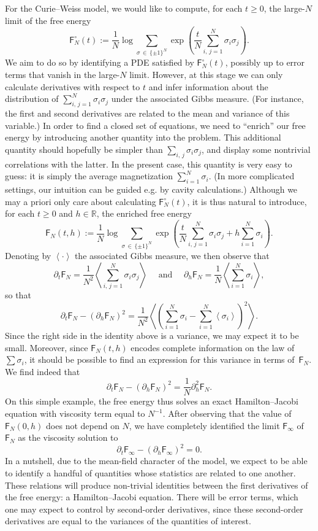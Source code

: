 \documentclass[10pt]{amsart}
\theoremstyle{definition}\newtheorem{defi}[theo]{Definition}\newtheorem{rema}[theo]{Remark}\newtheorem{exam}[theo]{Example}\newtheorem{exem}[theo]{Example}\newtheorem{nota}[theo]{Notation}
\newcommand{\R}{\mathbb{R}}
\newcommand{\sfF}{\mathsf{F}}
\newcommand{\1}{\mathds{1}}
\renewcommand{\ge}{\geqslant}
\newcommand{\la}{\left\langle}
\newcommand{\ra}{\right\rangle}
\begin{document}
For the Curie--Weiss model, we would like to compute, for each $t \ge 0$, the large-$N$ limit of the free energy
\[
\sfF_N^\circ(t) := \frac 1 N \log \sum_{\sigma\, \in\,\{\pm 1\}^N} \exp \left(\frac t N \sum_{i,\,j = 1}^N \sigma_i \sigma_j \right).
\]
We aim to do so by identifying a PDE satisfied by $\sfF_N^\circ(t)$, possibly up to error terms that vanish in the large-$N$ limit. However, at this stage we can only calculate derivatives with respect to $t$ and infer information about the distribution of $\sum_{i,\,j = 1}^N \sigma_i \sigma_j$ under the associated Gibbs measure. (For instance, the first and second derivatives are related to the mean and variance of this variable.) In order to find a closed set of equations, we need to ``enrich'' our free energy by introducing another quantity into the problem. This additional quantity should hopefully be simpler than $\sum_{i,\,j} \sigma_i \sigma_j$, and display some nontrivial correlations with the latter. In the present case, this quantity is very easy to guess: it is simply the average magnetization $\sum_{i = 1}^N \sigma_i$. (In more complicated settings, our intuition can be guided e.g. by cavity calculations.) Although we may a priori only care about calculating $\sfF_N^\circ(t)$, it is thus natural to introduce, for each $t \ge 0$ and $h \in \R$, the enriched free energy
\[
\sfF_N(t,h) := \frac 1 N \log \sum_{\sigma\,\in \,\{\pm1\}^N} \exp \left(\frac t N \sum_{i,\,j = 1}^N \sigma_i \sigma_j + h \sum_{i = 1}^N \sigma_i\right).
\]
Denoting by $\la \cdot \ra$ the associated Gibbs measure, we then observe that
\begin{equation}\label{e.also.rfcw}
\partial_t \sfF_N = \frac{1}{N^2} \la \sum_{i,\,j = 1}^N \sigma_i \sigma_j \ra \quad \text{ and } \quad
\partial_h \sfF_N = \frac{1}{N} \la \sum_{i = 1}^N \sigma_i \ra,
\end{equation}
so that
\[
\partial_t\sfF_N - \left(\partial_h \sfF_N\right)^2 = \frac 1 {N^2} \la \left(\sum_{i = 1}^N \sigma_i - \sum_{i = 1}^N\la \sigma_i \ra \right)^2 \ra.
\]
Since the right side in the identity above is a variance, we may expect it to be small. Moreover, since $\sfF_N(t,h)$ encodes complete information on the law of $\sum \sigma_i$, it should be possible to find an expression for this variance in terms of~$\sfF_N$. We find indeed that
\[
\partial_t\sfF_N - \left(\partial_h \sfF_N\right)^2 = \frac 1 N \partial_h^2 \sfF_N.
\]
On this simple example, the free energy thus solves an exact Hamilton--Jacobi equation with viscosity term equal to $N^{-1}$. After observing that the value of $\sfF_N(0,h)$ does not depend on $N$, we have completely identified the limit $\sfF_\infty$ of~$\sfF_N$ as the viscosity solution to
\[
\partial_t \sfF_\infty - \left(\partial_h \sfF_\infty\right)^2 = 0.
\]
In a nutshell, due to the mean-field character of the model, we expect to be able to identify a handful of quantities whose statistics are related to one another. These relations will produce non-trivial identities between the first derivatives of the free energy: a Hamilton--Jacobi equation. There will be error terms, which one may expect to control by second-order derivatives, since these second-order derivatives are equal to the variances of the quantities of interest.
\end{document}
